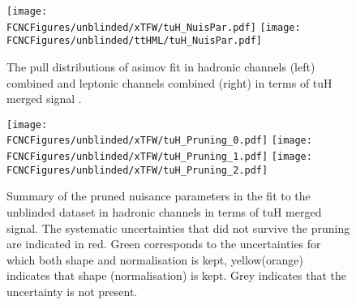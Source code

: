 








\begin{figure}[htb]
\centering
\texttt{[image: \\FCNCFigures/unblinded/xTFW/tuH\_NuisPar.pdf]}
\texttt{[image: \\FCNCFigures/unblinded/ttHML/tuH\_NuisPar.pdf]}
\caption{ The pull distributions of asimov fit in hadronic channels (left) combined and leptonic channels combined (right) in terms of tuH merged signal . }
\label{fig:fcnc_pull_data}
\end{figure}


\begin{figure}[htb]
\centering
\texttt{[image: \\FCNCFigures/unblinded/xTFW/tuH\_Pruning\_0.pdf]}
\texttt{[image: \\FCNCFigures/unblinded/xTFW/tuH\_Pruning\_1.pdf]}
\texttt{[image: \\FCNCFigures/unblinded/xTFW/tuH\_Pruning\_2.pdf]}
\caption{ Summary of the pruned nuisance parameters in the fit to the unblinded dataset in hadronic channels in terms of tuH merged signal. The systematic uncertainties that did not survive the pruning are indicated in red. Green corresponds to the uncertainties for which both shape and normalisation is kept, yellow(orange) indicates that shape (normalisation) is kept. Grey indicates that the uncertainty is not present.}
\label{fig:xTFW_pruning_0}
\end{figure}



